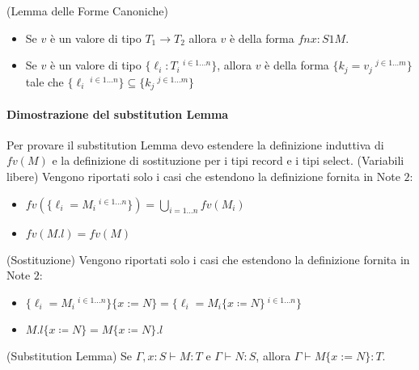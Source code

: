 (Lemma delle Forme Canoniche)
\begin{itemize}
 \item Se $v$ \`e un valore di tipo $T_1 \rightarrow T_2$ allora $v$ \`e della forma $fn x:S1M$.
 \item Se $v$ \`e un valore di tipo $\{\ell_i:T_i\ ^{i \in 1 \dots n}\}$, allora $v$ \`e della forma $\{k_j = v_j\ ^{j \in 1 \dots m} \}$
 tale che $\{\ell_i\ ^{i \in 1 \dots n} \} \subseteq \{k_j\ ^{j \in 1 \dots m}\}$
\end{itemize}

\paragraph{Dimostrazione del substitution Lemma}
Per provare il substitution Lemma devo estendere la definizione induttiva di $fv(M)$ e la definizione di sostituzione per i tipi 
record e i tipi select.
(Variabili libere)
	Vengono riportati solo i casi che estendono la definizione fornita in Note $2$:
	\begin{itemize}
		\item $fv(\{\ell_i = M_i\ ^{i \in 1 \dots n} \}) = \bigcup_{i = 1 \dots n} fv(M_i)$
		\item $fv(M.l) = fv(M)$
	\end{itemize}


(Sostituzione)
	Vengono riportati solo i casi che estendono la definizione fornita in Note $2$:
	\begin{itemize}
		\item $\{\ell_i = M_i\ ^{i \in 1 \dots n} \} \{x := N\} = \{\ell_i = M_i \{x \coloneqq N\}\ ^{i \in 1 \dots n} \}$
		\item $M.l\{x \coloneqq N \} = M\{x \coloneqq N \}.l$
	\end{itemize}



(Substitution Lemma)
Se $\Gamma, x : S \vdash M : T$ e $\Gamma \vdash N : S$, allora $\Gamma \vdash M\{x := N\}:T.$	

